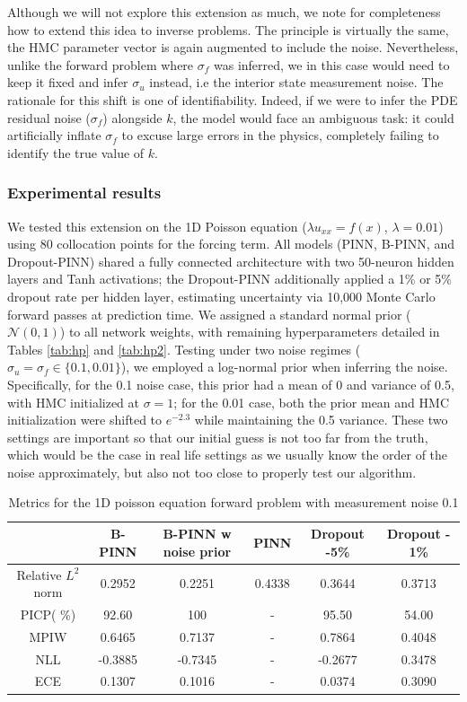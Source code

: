 \documentclass{article}
\begin{document}
 Although we will not explore this extension as much, we note for completeness how to extend this idea to inverse problems. The principle is virtually the same,  the HMC parameter vector is again augmented to include the noise. Nevertheless, unlike the forward problem where $\sigma_f$ was inferred, we in this case would need to keep it fixed and infer $\sigma_u$ instead, i.e the interior state measurement noise. The rationale for this shift is one of identifiability. Indeed, if we were to infer the PDE residual noise ($\sigma_f$) alongside $k$, the model would face an ambiguous task: it could artificially inflate $\sigma_f$ to excuse large errors in the physics, completely failing to identify the true value of $k$. 
\subsubsection{Experimental results}
 We tested this extension on the 1D Poisson equation ($\lambda u_{xx} = f(x)$, $\lambda=0.01$) using 80 collocation points for the forcing term. All models (PINN, B-PINN, and Dropout-PINN) shared a fully connected architecture with two 50-neuron hidden layers and Tanh activations; the Dropout-PINN additionally applied a 1\% or 5\% dropout rate per hidden layer, estimating uncertainty via 10,000 Monte Carlo forward passes at prediction time. We assigned a standard normal prior ($\mathcal{N}(0,1)$) to all network weights, with remaining hyperparameters detailed in Tables \ref{tab:hp} and \ref{tab:hp2}. Testing under two noise regimes ($\sigma_u = \sigma_f \in \{0.1, 0.01\}$), we employed a log-normal prior when inferring the noise. Specifically, for the 0.1 noise case, this prior had a mean of 0 and variance of 0.5, with HMC initialized at $\sigma=1$; for the 0.01 case, both the prior mean and HMC initialization were shifted to $e^{-2.3}$ while maintaining the 0.5 variance. These two settings are important so that our initial guess is not too far from the truth, which would be the case in real life settings as we usually know the order of the noise approximately, but also not too close to properly test our algorithm. 

\begin{table}[h]
\centering
\footnotesize
\begin{tabular}{|c|c|c|c|c|c|}
\hline
 & B-PINN & B-PINN w noise prior  & PINN & Dropout -5\% & Dropout - 1\%  \\
\hline
Relative $L^2$ norm & 0.2952  & 0.2251  &   0.4338 & 0.3644 &0.3713 \\
\hline
PICP( \%) & 92.60 & 100 & - & 95.50 & 54.00 \\
\hline
MPIW & 0.6465 & 0.7137 & - & 0.7864 & 0.4048 \\
\hline
NLL & -0.3885 & -0.7345 & - & -0.2677 & 0.3478 \\
\hline
ECE &  0.1307 & 0.1016 & -  & 0.0374 & 0.3090 \\
\hline
\end{tabular}
\caption{\footnotesize Metrics for the 1D poisson equation forward problem with measurement noise 0.1}
\label{tab:5x5}
\end{table}
\end{document}
